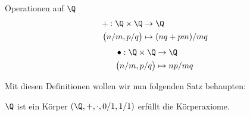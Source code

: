 \begin{definition}{Operationen auf $\Q$}{}
\begin{align*}
    +: \Q \times \Q &\to \Q\\
    \big(n/m, p/q\big) &\mapsto (nq + pm)/ mq
\end{align*}
\begin{align*}
    \bullet: \Q \times \Q &\to \Q\\
    \big(n/m, p/q\big) &\mapsto np/mq
\end{align*}
\end{definition}

Mit diesen Definitionen wollen wir nun folgenden Satz behaupten:

\begin{satz}{$\Q$ ist ein Körper}{}
$(\Q, +, \cdot, 0/1, 1/1)$ erfüllt die Körperaxiome.
\end{satz}

